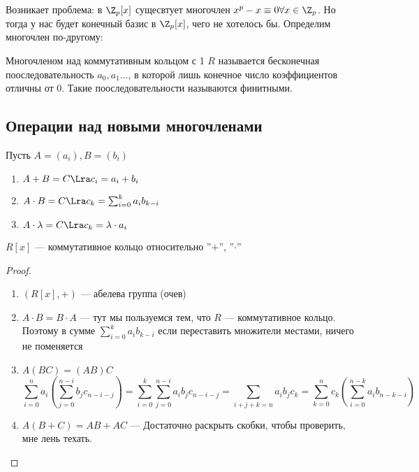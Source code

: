 \begin{note}
    Возникает проблема: в \(\Z_p[x]\) сущесвтует многочлен \(x^p - x \equiv 0 \forall x \in \Z_p\). Но тогда у нас будет конечный базис в \(\Z_p[x]\), чего не хотелось бы. Определим многочлен по-другому:
\end{note}

\begin{definition}
    Многочленом над коммутативным кольцом с 1 \(R\) называется бесконечная пооследовательность \(a_0, a_1 \dots \), в которой лишь конечное число коэффициентов отличны от 0. Такие пооследовательности называются финитными.
\end{definition}

\subsection{Операции над новыми многочленами}
Пусть \(A = (a_i), B = (b_i)\)
\begin{enumerate}
    \item \(A + B = C \Lra c_i = a_i + b_i\)
    \item \(A \cdot B = C \Lra c_k = \sum_{i = 0}^ka_ib_{k-i}\)
    \item \(A \cdot \lambda = C \Lra c_k = \lambda\cdot a_i\)
\end{enumerate}

\begin{proposition}
    \(R[x]\) --- коммутативное кольцо относительно ''\(+\)'', ''\(\cdot\)''
\end{proposition}
\begin{proof}\indent
    \begin{enumerate}
        \item \((R[x], +)\) --- абелева группа (очев)
        \item \(A \cdot B = B \cdot A\) --- тут мы пользуемся тем, что \(R\) --- коммутативное кольцо. Поэтому в сумме \(\sum_{i = 0}^ka_ib_{k-i}\) если переставить множители местами, ничего не поменяется
        \item \(A(BC) = (AB)C\) 
        \[\sum_{i = 0}^na_i\left(\sum_{j = 0}^{n-i}b_jc_{n-i-j}\right) = \sum_{i = 0}^k\sum_{j = 0}^{n-i}a_ib_jc_{n-i-j} = \sum_{i + j + k = n}a_ib_jc_k = \sum_{k = 0}^nc_k\left(\sum_{i = 0}^{n-k}a_ib_{n-k-i}\right)\]
        \item \(A(B + C) = AB + AC\) --- Достаточно раскрыть скобки, чтобы проверить, мне лень техать.
    \end{enumerate}
\end{proof}

